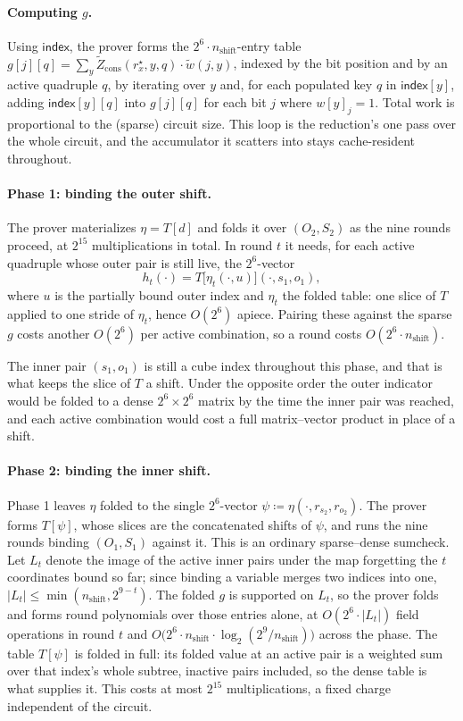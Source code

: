 \documentclass{article}
\theoremstyle{definition}
\newcommand*{\mle}{\widetilde}
\begin{document}
\paragraph{Computing $g$.}
Using $\textsf{index}$, the prover forms the $2^6 \cdot n_\text{shift}$-entry table $g[j][q] = \sum_y \mle{Z}_\text{cons}(r^\star_x, y, q) \cdot \mle{w}(j, y)$, indexed by the bit position and by an active quadruple $q$, by iterating over $y$ and, for each populated key $q$ in $\textsf{index}[y]$, adding $\textsf{index}[y][q]$ into $g[j][q]$ for each bit $j$ where $w[y]_j = 1$. Total work is proportional to the (sparse) circuit size. This loop is the reduction's one pass over the whole circuit, and the accumulator it scatters into stays cache-resident throughout.

\paragraph{Phase 1: binding the outer shift.}
The prover materializes $\eta = T[d]$ and folds it over $(O_2, S_2)$ as the nine rounds proceed, at $2^{15}$ multiplications in total. In round $t$ it needs, for each active quadruple whose outer pair is still live, the $2^6$-vector
\[
  h_t(\cdot) = T\bigl[ \eta_t(\cdot, u) \bigr](\cdot, s_1, o_1),
\]
where $u$ is the partially bound outer index and $\eta_t$ the folded table: one slice of $T$ applied to one stride of $\eta_t$, hence $O(2^6)$ apiece. Pairing these against the sparse $g$ costs another $O(2^6)$ per active combination, so a round costs $O(2^6 \cdot n_\text{shift})$.

The inner pair $(s_1, o_1)$ is still a cube index throughout this phase, and that is what keeps the slice of $T$ a shift. Under the opposite order the outer indicator would be folded to a dense $2^6 \times 2^6$ matrix by the time the inner pair was reached, and each active combination would cost a full matrix--vector product in place of a shift.

\paragraph{Phase 2: binding the inner shift.}
Phase 1 leaves $\eta$ folded to the single $2^6$-vector $\psi \coloneqq \eta(\cdot, r_{s_2}, r_{o_2})$. The prover forms $T[\psi]$, whose slices are the concatenated shifts of $\psi$, and runs the nine rounds binding $(O_1, S_1)$ against it. This is an ordinary sparse--dense sumcheck. Let $L_t$ denote the image of the active inner pairs under the map forgetting the $t$ coordinates bound so far; since binding a variable merges two indices into one, $|L_t| \leq \min(n_\text{shift}, 2^{9 - t})$. The folded $g$ is supported on $L_t$, so the prover folds and forms round polynomials over those entries alone, at $O(2^6 \cdot |L_t|)$ field operations in round $t$ and $O\bigl( 2^6 \cdot n_\text{shift} \cdot \log_2 (2^9 / n_\text{shift}) \bigr)$ across the phase. The table $T[\psi]$ is folded in full: its folded value at an active pair is a weighted sum over that index's whole subtree, inactive pairs included, so the dense table is what supplies it. This costs at most $2^{15}$ multiplications, a fixed charge independent of the circuit.
\end{document}
